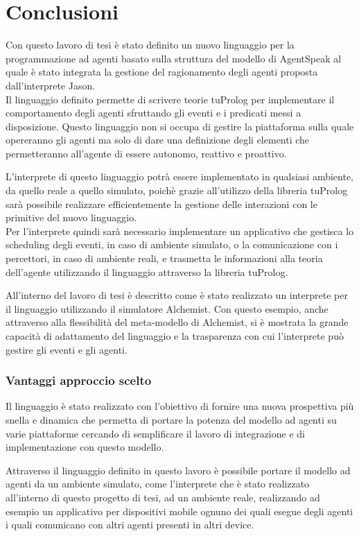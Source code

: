 \chapter*{Conclusioni}
Con questo lavoro di tesi è stato definito un nuovo linguaggio per la programmazione ad agenti basato sulla struttura del modello di AgentSpeak al quale è stato integrata la gestione del ragionamento degli agenti proposta dall'interprete Jason.
\\
Il linguaggio definito permette di scrivere teorie tuProlog per implementare il comportamento degli agenti sfruttando gli eventi e i predicati messi a disposizione.
Questo linguaggio non si occupa di gestire la piattaforma sulla quale opereranno gli agenti ma solo di dare una definizione degli elementi che permetteranno all'agente di essere autonomo, reattivo e proattivo.

L'interprete di questo linguaggio potrà essere implementato in qualsiasi ambiente, da quello reale a quello simulato, poichè grazie all'utilizzo della libreria tuProlog sarà possibile realizzare efficientemente la gestione delle interazioni con le primitive del nuovo linguaggio.
\\
Per l'interprete quindi sarà necessario implementare un applicativo che gestisca lo scheduling degli eventi, in caso di ambiente simulato, o la comunicazione con i percettori, in caso di ambiente reali, e trasmetta le informazioni alla teoria dell'agente utilizzando il linguaggio attraverso la libreria tuProlog.

All'interno del lavoro di tesi è descritto come è stato realizzato un interprete per il linguaggio utilizzando il simulatore Alchemist.
Con questo esempio, anche attraverso alla flessibilità del meta-modello di Alchemist, si è mostrata la grande capacità di adattamento del linguaggio e la trasparenza con cui l'interprete può gestire gli eventi e gli agenti. 

\subsection*{Vantaggi approccio scelto}
Il linguaggio è stato realizzato con l'obiettivo di fornire una nuova prospettiva più snella e dinamica che permetta di portare la potenza del modello ad agenti su varie piattaforme cercando di semplificare il lavoro di integrazione e di implementazione con questo modello.

Attraverso il linguaggio definito in questo lavoro è possibile portare il modello ad agenti da un ambiente simulato, come l'interprete che è stato realizzato all'interno di questo progetto di tesi, ad un ambiente reale, realizzando ad esempio un applicativo per dispositivi mobile ognuno dei quali esegue degli agenti i quali comunicano con altri agenti presenti in altri device.